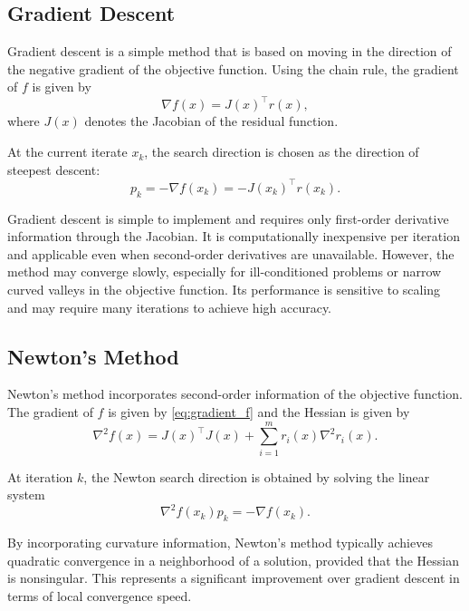 \subsection{Gradient Descent}
Gradient descent \cite{madsen2004} is a simple method that is based on moving in the direction of the negative gradient of the objective function. 
Using the chain rule, the gradient of $f$ is given by
\begin{equation}
\label{eq:gradient_f}
    \nabla f(x) = J(x)^\top r(x),
\end{equation}
where $J(x)$ denotes the Jacobian of the residual function.

At the current iterate $x_k$, the search direction is chosen as the direction of steepest descent:
\begin{equation}
\label{eq:steepest_descent}
    p_k = - \nabla f(x_k) = - J(x_k)^\top r(x_k).
\end{equation}

Gradient descent is simple to implement and requires only first-order derivative information through the Jacobian. It is computationally inexpensive per iteration and applicable even when second-order derivatives are unavailable. However, the method may converge slowly, especially for ill-conditioned problems or narrow curved valleys in the objective function. Its performance is sensitive to scaling and may require many iterations to achieve high accuracy.

\subsection{Newton's Method}

Newton's method \cite{madsen2004} incorporates second-order information of the objective function. 
The gradient of $f$ is given by \cref{eq:gradient_f} and the Hessian is given by
\begin{equation}
\label{eq:hessian}
    \nabla^2 f(x) = J(x)^\top J(x) + \sum_{i=1}^m r_i(x)\nabla^2 r_i(x).
\end{equation}

At iteration $k$, the Newton search direction is obtained by solving the linear system
\begin{equation*}
    \nabla^2 f(x_k) p_k = - \nabla f(x_k).
\end{equation*}

By incorporating curvature information, Newton's method typically achieves quadratic convergence in a neighborhood of a solution, provided that the Hessian is nonsingular. This represents a significant improvement over gradient descent in terms of local convergence speed.\\

